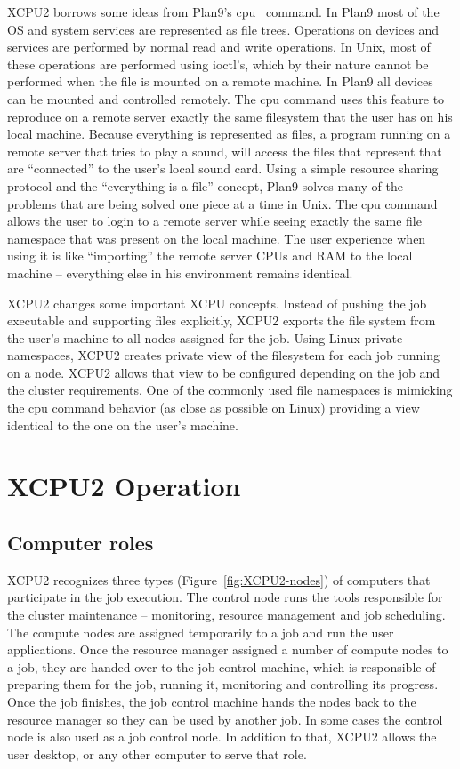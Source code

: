 \documentclass[10pt,conference,letterpaper]{IEEEtran}
\begin{document}
XCPU2 borrows some ideas from Plan9's cpu~\cite{plan9-cpu} command. In Plan9
most of the OS and system services are represented as file trees. Operations
on devices and services are performed by normal read and write operations.
In Unix, most of these operations are performed using ioctl's, which by
their nature cannot be performed when the file is mounted on a remote
machine. In Plan9 all devices can be mounted and controlled remotely. The
cpu command uses this feature to reproduce on a remote server exactly the
same filesystem that the user has on his local machine. Because everything
is represented as files, a program running on a remote server that tries to
play a sound, will access the files that represent that are ``connected'' to
the user's local sound card. Using a simple resource sharing protocol and
the ``everything is a file'' concept, Plan9 solves many of the problems that
are being solved one piece at a time in Unix. The cpu command allows the
user to login to a remote server while seeing exactly the same file
namespace that was present on the local machine. The user experience when
using it is like ``importing'' the remote server CPUs and RAM to the local
machine -- everything else in his environment remains identical.

XCPU2 changes some important XCPU concepts. Instead of pushing the job
executable and supporting files explicitly, XCPU2 exports the file system
from the user's machine to all nodes assigned for the job. Using Linux
private namespaces, XCPU2 creates private view of the filesystem for each
job running on a node. XCPU2 allows that view to be configured depending on
the job and the cluster requirements. One of the commonly used file
namespaces is mimicking the cpu command behavior (as close as possible on
Linux) providing a view identical to the one on the user's machine.

\section{XCPU2 Operation}

\subsection{Computer roles}

XCPU2 recognizes three types (Figure~\ref{fig:XCPU2-nodes}) of computers
that participate in the job execution. The control node runs the tools
responsible for the cluster maintenance -- monitoring, resource management
and job scheduling. The compute nodes are assigned temporarily to a job and
run the user applications. Once the resource manager assigned a number of
compute nodes to a job, they are handed over to the job control machine,
which is responsible of preparing them for the job, running it, monitoring
and controlling its progress. Once the job finishes, the job control machine
hands the nodes back to the resource manager so they can be used by another
job. In some cases the control node is also used as a job control node.
In addition to that, XCPU2 allows the user desktop, or any other computer to
serve that role.
\end{document}
